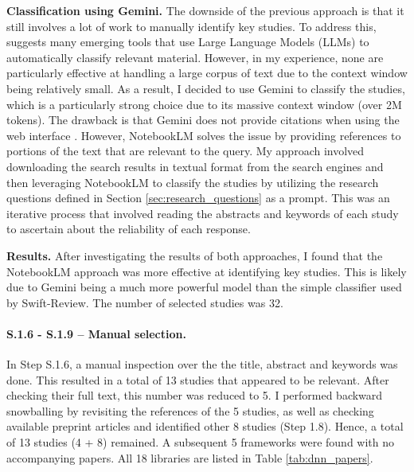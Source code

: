 \textbf{Classification using Gemini.}
The downside of the previous approach is that it still involves a lot of work to manually identify key
studies. To address this, \cite{bolanos_artificial_2024} suggests many emerging tools that use Large Language Models (LLMs)
to automatically classify relevant material. However, in my experience, none are particularly effective
at handling a large corpus of text due to the context window being relatively small. As a result, I decided
to use Gemini \cite{team_gemini_2024} to classify the studies, which is a particularly strong choice due to its massive
context window (over 2M tokens). The drawback is that Gemini does not provide citations when using the web interface
\cite{noauthor_gemini_nodate}. However, NotebookLM \cite{notebooklm_google_2024} solves the issue by providing references
to portions of the text that are relevant to the query. My approach involved downloading the search results in textual format from the
search engines and then leveraging NotebookLM to classify the studies by utilizing the research questions
defined in Section \ref{sec:research_questions} as a prompt. This was an iterative process that involved
reading the abstracts and keywords of each study to ascertain about the reliability of each response.

\textbf{Results.}
After investigating the results of both approaches, I found that the NotebookLM approach was more
effective at identifying key studies. This is likely due to Gemini being a much more powerful
model than the simple classifier used by Swift-Review. The number of selected studies was 32.

\paragraph{S.1.6 - S.1.9 -- Manual selection.}
In Step S.1.6, a manual inspection over the the title, abstract and keywords was done. This
resulted in a total of 13 studies that appeared to be relevant. After checking their full text,
this number was reduced to 5. I performed backward snowballing \cite{jalali_systematic_2012} by
revisiting the references of the 5 studies, as well as checking available preprint articles and
identified other 8 studies (Step 1.8). Hence, a total of 13 studies (4 + 8) remained. A subsequent
5 frameworks were found with no accompanying papers. All 18 libraries are listed in Table
\ref{tab:dnn_papers}.

